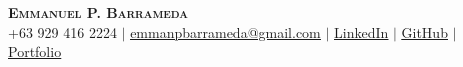 \documentclass[letterpaper,11pt]{article}
\begin{document}

\begin{center}
    \textbf{\Huge \scshape Emmanuel P. Barrameda} \\ \vspace{1pt}
    \small +63 929 416 2224 $|$ \href{mailto:emmanpbarrameda@gmail.com}{\underline{emmanpbarrameda@gmail.com}} $|$ 
    \href{https://linkedin.com/in/emmanpbarrameda}{\underline{LinkedIn}} $|$
    \href{https://github.com/emmanpbarrameda}{\underline{GitHub}} $|$
    \href{https://emmanpbarrameda.github.io/}{\underline{Portfolio}}
\end{center}




\end{document}
